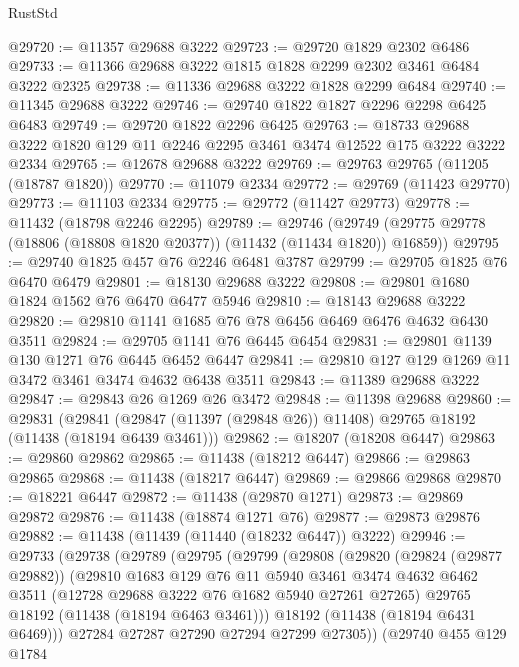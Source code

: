 \begin{lexlean}{RustStd}
\begin{coremodule}
@29720 := @11357 @29688 @3222
@29723 := @29720 @1829 @2302 @6486
@29733 := @11366 @29688 @3222 @1815 @1828 @2299 @2302 @3461 @6484 @3222 @2325
@29738 := @11336 @29688 @3222 @1828 @2299 @6484
@29740 := @11345 @29688 @3222
@29746 := @29740 @1822 @1827 @2296 @2298 @6425 @6483
@29749 := @29720 @1822 @2296 @6425
@29763 := @18733 @29688 @3222 @1820 @129 @11 @2246 @2295 @3461 @3474 @12522 @175 @3222 @3222 @2334
@29765 := @12678 @29688 @3222
@29769 := @29763 @29765 (@11205 (@18787 @1820))
@29770 := @11079 @2334
@29772 := @29769 (@11423 @29770)
@29773 := @11103 @2334
@29775 := @29772 (@11427 @29773)
@29778 := @11432 (@18798 @2246 @2295)
@29789 := @29746
    (@29749 (@29775 @29778 (@18806 (@18808 @1820 @20377)) (@11432 (@11434 @1820)) @16859))
@29795 := @29740 @1825 @457 @76 @2246 @6481 @3787
@29799 := @29705 @1825 @76 @6470 @6479
@29801 := @18130 @29688 @3222
@29808 := @29801 @1680 @1824 @1562 @76 @6470 @6477 @5946
@29810 := @18143 @29688 @3222
@29820 := @29810 @1141 @1685 @76 @78 @6456 @6469 @6476 @4632 @6430 @3511
@29824 := @29705 @1141 @76 @6445 @6454
@29831 := @29801 @1139 @130 @1271 @76 @6445 @6452 @6447
@29841 := @29810 @127 @129 @1269 @11 @3472 @3461 @3474 @4632 @6438 @3511
@29843 := @11389 @29688 @3222
@29847 := @29843 @26 @1269 @26 @3472
@29848 := @11398 @29688
@29860 := @29831
    (@29841 (@29847 (@11397 (@29848 @26)) @11408) @29765 @18192 (@11438 (@18194 @6439 @3461)))
@29862 := @18207 (@18208 @6447)
@29863 := @29860 @29862
@29865 := @11438 (@18212 @6447)
@29866 := @29863 @29865
@29868 := @11438 (@18217 @6447)
@29869 := @29866 @29868
@29870 := @18221 @6447
@29872 := @11438 (@29870 @1271)
@29873 := @29869 @29872
@29876 := @11438 (@18874 @1271 @76)
@29877 := @29873 @29876
@29882 := @11438 (@11439 (@11440 (@18232 @6447)) @3222)
@29946 := @29733
    (@29738
      (@29789
        (@29795
          (@29799
            (@29808
              (@29820
                (@29824 (@29877 @29882))
                (@29810
                  @1683
                  @129
                  @76
                  @11
                  @5940
                  @3461
                  @3474
                  @4632
                  @6462
                  @3511
                  (@12728 @29688 @3222 @76 @1682 @5940 @27261 @27265)
                  @29765
                  @18192
                  (@11438 (@18194 @6463 @3461)))
                @18192
                (@11438 (@18194 @6431 @6469)))
              @27284
              @27287
              @27290
              @27294
              @27299
              @27305))
          (@29740
            @455
            @129
            @1784

\end{coremodule}
\end{lexlean}
